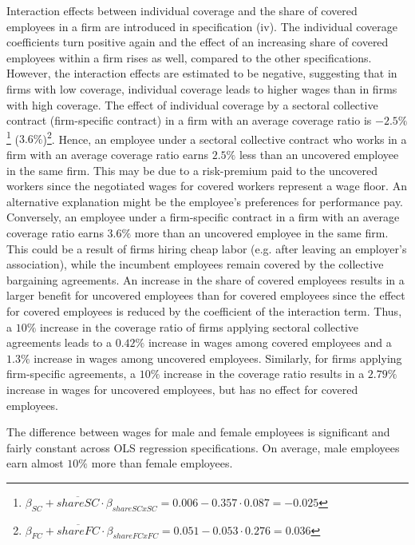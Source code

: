 Interaction effects between individual coverage and the share of covered employees in a firm are introduced in specification (iv). The individual coverage coefficients turn positive again and the effect of an increasing share of covered employees within a firm rises as well, compared to the other specifications. However, the interaction effects are estimated to be negative, suggesting that in firms with low coverage, individual coverage leads to higher wages than in firms with high coverage. The effect of individual coverage by a sectoral collective contract (firm-specific contract) in a firm with an average coverage ratio is $-2.5\%$\footnote{ $\beta_{SC}+\overline{shareSC}\cdot \beta_{shareSCxSC}=0.006- 0.357\cdot 0.087 =-0.025$} ($3.6\%$)\footnote{ $\beta_{FC}+\overline{shareFC}\cdot \beta_{shareFCxFC}=0.051-0.053 \cdot 0.276=0.036$}. Hence, an employee under a sectoral collective contract who works in a firm with an average coverage ratio earns $2.5\%$ less than an uncovered employee in the same firm. This may be due to a risk-premium paid to the uncovered workers since the negotiated wages for covered workers represent a wage floor. An alternative explanation might be the employee's preferences for performance pay. Conversely, an employee under a firm-specific contract in a firm with an average coverage ratio earns $3.6\%$ more than an uncovered employee in the same firm. This could be a result of firms hiring cheap labor (e.g. after leaving an employer's association), while the incumbent employees remain covered by the collective bargaining agreements. An increase in the share of covered employees results in a larger benefit for uncovered employees than for covered employees since the effect for covered employees is reduced by the coefficient of the interaction term. Thus, a $10\%$ increase in the coverage ratio of firms applying sectoral collective agreements leads to a $0.42\%$ increase in wages among covered employees and a $1.3\%$ increase in wages among uncovered employees. Similarly, for firms applying firm-specific agreements, a $10\%$ increase in the coverage ratio results in a $2.79\%$ increase in wages for uncovered employees, but has no effect for covered employees.

The difference between wages for male and female employees is significant and fairly constant across OLS regression specifications. On average, male employees earn almost $10\%$ more than female employees.

